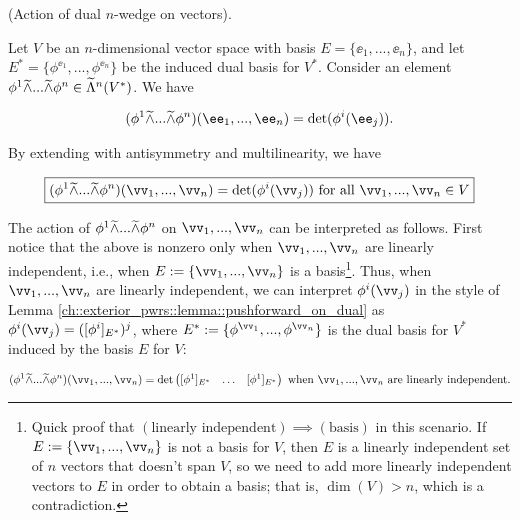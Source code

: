 \begin{theorem}
\label{ch::exterior_pwrs::thm::action_dual_k_wedge_on_vectors}
    (Action of dual $n$-wedge on vectors).
    
    Let $V$ be an $n$-dimensional vector space with basis $E = \{\ee_1, ..., \ee_n\}$, and let $E^* = \{\phi^{\ee_1}, ..., \phi^{\ee_n}\}$ be the induced dual basis for $V^*$. Consider an element $\phi^1 \widetilde{\wedge} ... \widetilde{\wedge} \phi^n \in \widetilde{\Lambda}^n(V^*)$. We have
    
    \begin{align*}
        (\phi^1 \twedge ... \twedge \phi^n)(\ee_1, ..., \ee_n) = \det(\phi^i(\ee_j)).
    \end{align*}
    
    By extending with antisymmetry and multilinearity, we have
    
    \begin{align*}
        \boxed
        {
            (\phi^1 \twedge ... \twedge \phi^n)(\vv_1, ..., \vv_n) = \det(\phi^i(\vv_j)) \text{ for all $\vv_1, ..., \vv_n \in V$}
        }
    \end{align*}
    
    The action of $\phi^1 \widetilde{\wedge} ... \widetilde{\wedge} \phi^n$ on $\vv_1, ..., \vv_n$ can be interpreted as follows. First notice that the above is nonzero only when $\vv_1, ..., \vv_n$ are linearly independent, i.e., when $E := \{\vv_1, ..., \vv_n\}$ is a basis\footnote{Quick proof that $(\text{linearly independent}) \implies (\text{basis})$ in this scenario. If $E := \{\vv_1, ..., \vv_n\}$ is not a basis for $V$, then $E$ is a linearly independent set of $n$ vectors that doesn't span $V$, so we need to add more linearly independent vectors to $E$ in order to obtain a basis; that is, $\dim(V) > n$, which is a contradiction.}. Thus, when $\vv_1, ..., \vv_n$ are linearly independent, we can interpret $\phi^i(\vv_j)$ in the style of Lemma \ref{ch::exterior_pwrs::lemma::pushforward_on_dual} as $\phi^i(\vv_j) = ([\phi^i]_{E^*})^j$, where ${E^* := \{\phi^{\vv_1}, ..., \phi^{\vv_n}\}}$ is the dual basis for $V^*$ induced by the basis $E$ for $V$:
    
    \begin{align*}
        (\phi^1 \twedge ... \twedge \phi^n)(\vv_1, ..., \vv_n) = \det \begin{pmatrix} [\phi^1]_{E^*} & \hdots & [\phi^1]_{E^*} \end{pmatrix} \text{ when $\vv_1, ..., \vv_n$ are linearly independent}.
    \end{align*}
\end{theorem}

